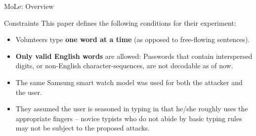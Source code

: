 \documentclass[ucs,9pt,usenames,dvipsnames]{beamer}
\begin{document}
\begin{frame}{MoLe: Overview}
\end{frame}


\begin{frame}{Constraints}
	This paper defines the following conditions for their experiment:
	\begin{itemize}
		\item Volunteers type \textbf{one word at a time} (as opposed to free-flowing
		sentences).
		\item \textbf{Only valid English words} are allowed: Passwords that contain interspersed digits, or non-English character-sequences, are not decodable as of now.
		\item  The same Samsung smart watch model was used for both
		the attacker and the user.
		\item They assumed the user is seasoned in typing in that he/she roughly
		uses the appropriate fingers – novice typists who do not abide by
		basic typing rules may not be subject to the proposed attacks.
	\end{itemize}
\end{frame}
\end{document}
